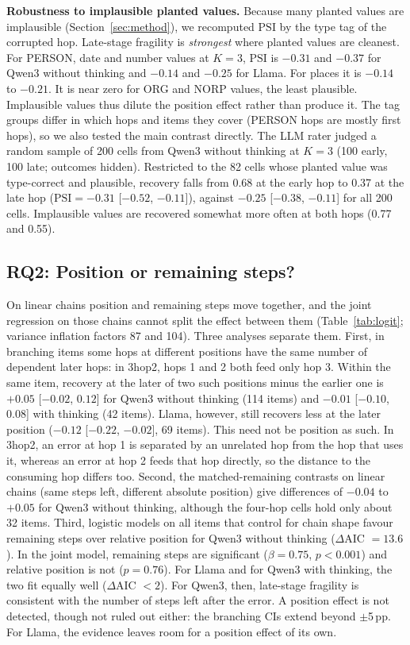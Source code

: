 \documentclass[conference]{IEEEtran}
\newcommand{\PSI}{\mathrm{PSI}}
\begin{document}
\textbf{Robustness to implausible planted values.}
\label{sec:res-tags}
Because many planted values are implausible (Section~\ref{sec:method}), we recomputed $\PSI$ by the type tag of the corrupted hop. Late-stage fragility is \emph{strongest} where planted values are cleanest. For PERSON, date and number values at $K{=}3$, $\PSI$ is $-0.31$ and $-0.37$ for Qwen3 without thinking and $-0.14$ and $-0.25$ for Llama. For places it is $-0.14$ to $-0.21$. It is near zero for ORG and NORP values, the least plausible. Implausible values thus dilute the position effect rather than produce it. The tag groups differ in which hops and items they cover (PERSON hops are mostly first hops), so we also tested the main contrast directly. The LLM rater judged a random sample of 200 cells from Qwen3 without thinking at $K{=}3$ (100 early, 100 late; outcomes hidden). Restricted to the 82 cells whose planted value was type-correct and plausible, recovery falls from 0.68 at the early hop to 0.37 at the late hop ($\PSI=-0.31$ [$-0.52$, $-0.11$]), against $-0.25$ [$-0.38$, $-0.11$] for all 200 cells. Implausible values are recovered somewhat more often at both hops (0.77 and 0.55).

\subsection{RQ2: Position or remaining steps?}
\label{sec:res-rq2}
On linear chains position and remaining steps move together, and the joint regression on those chains cannot split the effect between them (Table~\ref{tab:logit}; variance inflation factors 87 and 104). Three analyses separate them.
First, in branching items some hops at different positions have the same number of dependent later hops: in 3hop2, hops 1 and 2 both feed only hop 3. Within the same item, recovery at the later of two such positions minus the earlier one is $+0.05$ [$-0.02$, $0.12$] for Qwen3 without thinking (114 items) and $-0.01$ [$-0.10$, $0.08$] with thinking (42 items). Llama, however, still recovers less at the later position ($-0.12$ [$-0.22$, $-0.02$], 69 items). This need not be position as such. In 3hop2, an error at hop 1 is separated by an unrelated hop from the hop that uses it, whereas an error at hop 2 feeds that hop directly, so the distance to the consuming hop differs too.
Second, the matched-remaining contrasts on linear chains (same steps left, different absolute position) give differences of $-0.04$ to $+0.05$ for Qwen3 without thinking, although the four-hop cells hold only about 32 items.
Third, logistic models on all items that control for chain shape favour remaining steps over relative position for Qwen3 without thinking ($\Delta$AIC $=13.6$). In the joint model, remaining steps are significant ($\beta=0.75$, $p<0.001$) and relative position is not ($p=0.76$). For Llama and for Qwen3 with thinking, the two fit equally well ($\Delta$AIC $<2$).
For Qwen3, then, late-stage fragility is consistent with the number of steps left after the error. A position effect is not detected, though not ruled out either: the branching CIs extend beyond $\pm$5\,pp. For Llama, the evidence leaves room for a position effect of its own.
\end{document}
